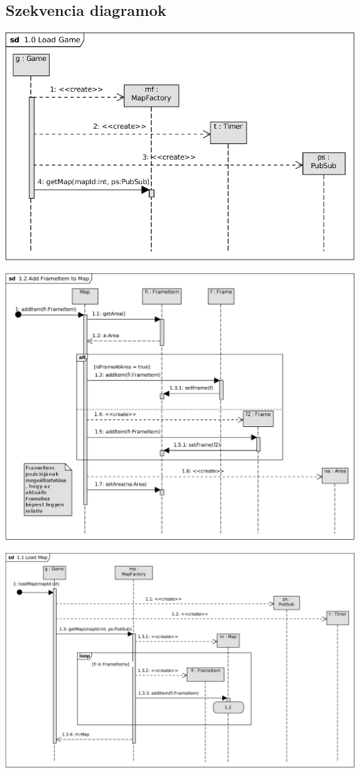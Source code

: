 	\subsection{Szekvencia diagramok}
	
\begin{center}\includegraphics[scale=1]{resources/10LoadGame.png}\end{center}
\begin{center}\includegraphics[scale=0.8]{resources/12AddFrameItemtoMap.png}\end{center}
\begin{center}\includegraphics[scale=1, angle=-90]{resources/11LoadMap.png}\end{center}
